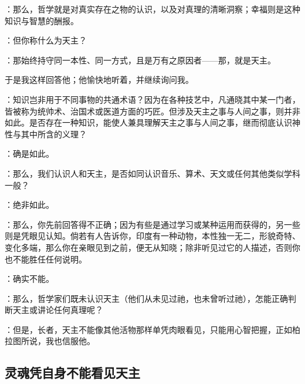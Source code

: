 ：那么，哲学就是对真实存在之物的认识，以及对真理的清晰洞察；幸福则是这种知识与智慧的酬报。\par

：但你称什么为天主？\par

：那始终持守同一本性、同一方式，且是万有之原因者——那，就是天主。\par

于是我这样回答他；他愉快地听着，并继续询问我。\par

：知识岂非用于不同事物的共通术语？因为在各种技艺中，凡通晓其中某一门者，皆被称为统帅术、治国术或医道方面的巧匠。但涉及天主之事与人间之事，则并非如此。是否存在一种知识，能使人兼具理解天主之事与人间之事，继而彻底认识神性与其中所含的义理？\par

：确是如此。\par

：那么，我们认识人和天主，是否如同认识音乐、算术、天文或任何其他类似学科一般？\par

：绝非如此。\par

：那么，你先前回答得不正确；因为有些是通过学习或某种运用而获得的，另一些则是凭眼见认知。倘若有人告诉你，印度有一种动物，本性独一无二，形貌奇特、变化多端，那么你在亲眼见到之前，便无从知晓；除非听见过它的人描述，否则你也不能胜任任何说明。\par

：确实不能。\par

：那么，哲学家们既未认识天主（他们从未见过祂，也未曾听过祂），怎能正确判断天主或讲论任何真理呢？\par

：但是，长者，天主不能像其他活物那样单凭肉眼看见，只能用心智把握，正如柏拉图所说，我也信服他。\par


\subsection{灵魂凭自身不能看见天主}

\begin{quotation}
\Emph{}
\end{quotation}

